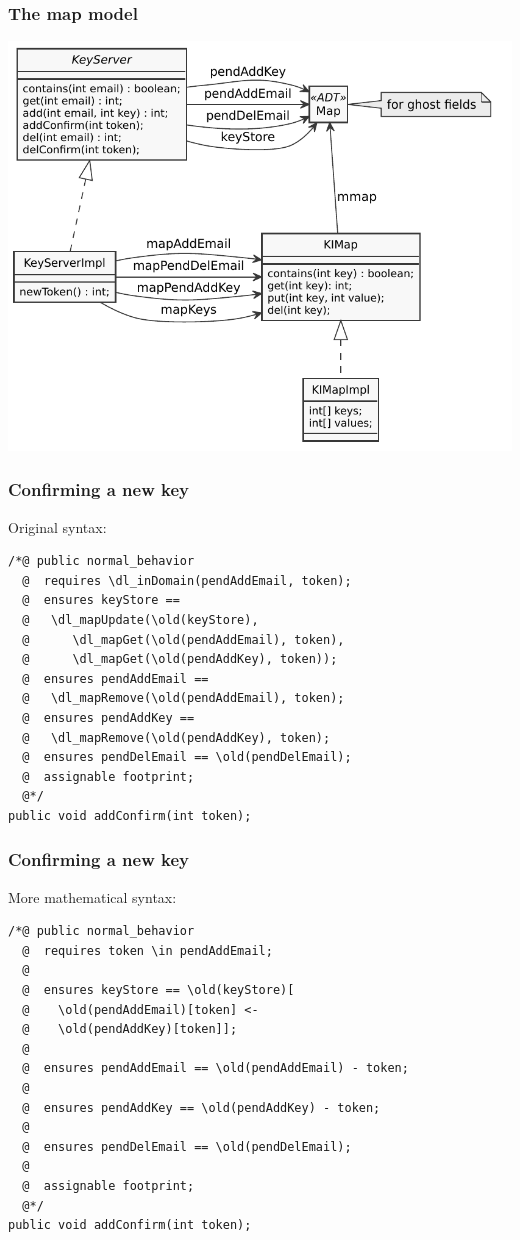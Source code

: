 \documentclass{beamer}
\begin{document}

\lstset {
  basicstyle=\footnotesize\ttfamily,
}

\begin{frame}
  \frametitle{The map model}
  \centering  \includegraphics[height=.9\textheight]{imap}
\end{frame}

\begin{frame}[fragile]
  \frametitle{Confirming a new key}

Original syntax: 
\begin{lstlisting}
/*@ public normal_behavior
  @  requires \dl_inDomain(pendAddEmail, token);
  @  ensures keyStore == 
  @   \dl_mapUpdate(\old(keyStore), 
  @      \dl_mapGet(\old(pendAddEmail), token), 
  @      \dl_mapGet(\old(pendAddKey), token));
  @  ensures pendAddEmail == 
  @   \dl_mapRemove(\old(pendAddEmail), token);
  @  ensures pendAddKey == 
  @   \dl_mapRemove(\old(pendAddKey), token);
  @  ensures pendDelEmail == \old(pendDelEmail);
  @  assignable footprint;
  @*/
public void addConfirm(int token);
\end{lstlisting}
\end{frame}


\begin{frame}[fragile]
  \frametitle{Confirming a new key}
  More mathematical syntax:
\begin{lstlisting}
/*@ public normal_behavior
  @  requires token \in pendAddEmail;
  @
  @  ensures keyStore == \old(keyStore)[
  @    \old(pendAddEmail)[token] <-
  @    \old(pendAddKey)[token]];
  @
  @  ensures pendAddEmail == \old(pendAddEmail) - token;
  @
  @  ensures pendAddKey == \old(pendAddKey) - token;
  @
  @  ensures pendDelEmail == \old(pendDelEmail);
  @ 
  @  assignable footprint;
  @*/
public void addConfirm(int token);
\end{lstlisting}
\end{frame}
\end{document}

